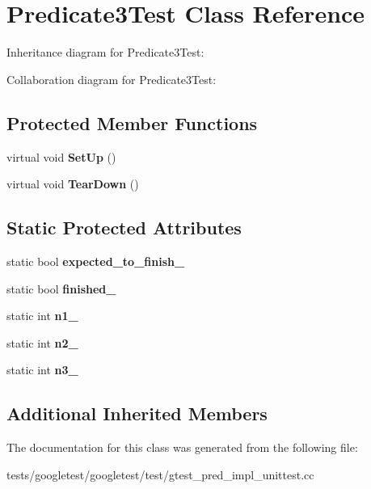 \hypertarget{classPredicate3Test}{}\section{Predicate3\+Test Class Reference}
\label{classPredicate3Test}


Inheritance diagram for Predicate3\+Test\+:


Collaboration diagram for Predicate3\+Test\+:
\subsection*{Protected Member Functions}
\begin{DoxyCompactItemize}
\item 
\mbox{\label{classPredicate3Test_a92aad9566e0737b6739d1db14e7912be}} 
virtual void {\bfseries Set\+Up} ()
\item 
\mbox{\label{classPredicate3Test_aa4dc395bded849b6e5175566d791aba7}} 
virtual void {\bfseries Tear\+Down} ()
\end{DoxyCompactItemize}
\subsection*{Static Protected Attributes}
\begin{DoxyCompactItemize}
\item 
\mbox{\label{classPredicate3Test_a42c11555410ee89bf6e59d39336a212c}} 
static bool {\bfseries expected\+\_\+to\+\_\+finish\+\_\+}
\item 
\mbox{\label{classPredicate3Test_aa2ef0fa6aed09d872fb9ae36961b49eb}} 
static bool {\bfseries finished\+\_\+}
\item 
\mbox{\label{classPredicate3Test_ac232320a93f0c1e09886148a3e1929a5}} 
static int {\bfseries n1\+\_\+}
\item 
\mbox{\label{classPredicate3Test_a11049ef16bcaadc8262faf7349c7676e}} 
static int {\bfseries n2\+\_\+}
\item 
\mbox{\label{classPredicate3Test_afc1df6b079ffe22b87479b161d2ad2f7}} 
static int {\bfseries n3\+\_\+}
\end{DoxyCompactItemize}
\subsection*{Additional Inherited Members}


The documentation for this class was generated from the following file\+:\begin{DoxyCompactItemize}
\item 
tests/googletest/googletest/test/gtest\+\_\+pred\+\_\+impl\+\_\+unittest.\+cc\end{DoxyCompactItemize}
